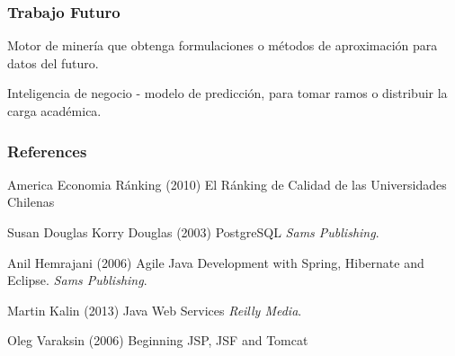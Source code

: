 \documentclass{beamer}
\begin{document}

\begin{frame}
\frametitle{Trabajo Futuro}
\begin{block}{}
Motor de minería que obtenga formulaciones o métodos de aproximación para datos del futuro.
\end{block}
\begin{block}{}
Inteligencia de negocio - modelo de predicción, para tomar ramos o distribuir la carga académica.
\end{block}
\end{frame}


\begin{frame}
\frametitle{References}
\footnotesize{
\begin{thebibliography}{99} %
 America Economia Ránking (2010)
\newblock El Ránking de Calidad de las Universidades Chilenas
\end{thebibliography}

\begin{thebibliography}{99} %
 Susan Douglas Korry Douglas (2003)
\newblock PostgreSQL
\newblock \emph{Sams Publishing}.
\end{thebibliography}

\begin{thebibliography}{99} %
 Anil Hemrajani (2006)
\newblock Agile Java Development with Spring, Hibernate and Eclipse.
\newblock \emph{Sams Publishing}.
\end{thebibliography}

\begin{thebibliography}{99} %
 Martin Kalin (2013)
\newblock Java Web Services
\newblock \emph{Reilly Media}.
\end{thebibliography}

\begin{thebibliography}{99} %
 Oleg Varaksin (2006)
\newblock Beginning JSP, JSF and Tomcat
\end{thebibliography}
}
\end{frame}
\end{document}
